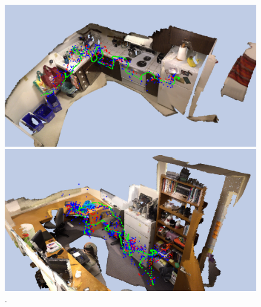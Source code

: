 \begin{figure}
    \centering

	\includegraphics[width=\linewidth]{results/models/kitchen}
	
	\includegraphics[width=\linewidth]{results/models/manolis}
	
	\caption[]{\label{fig:res_visualization_gene} .}
	
\end{figure}